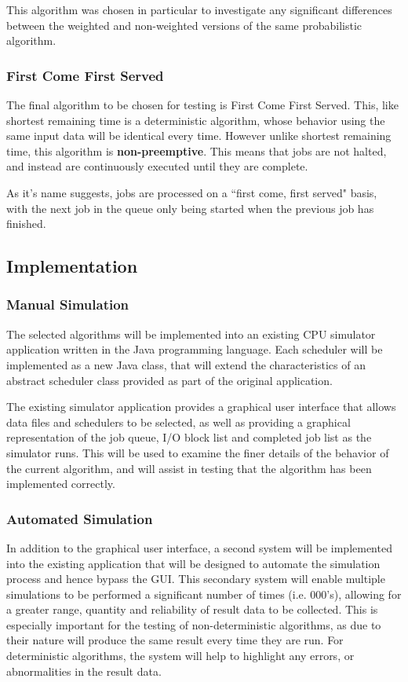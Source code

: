\documentclass{acm_proc_article-sp}
\begin{document}
This algorithm was chosen in particular to investigate any significant differences between the weighted and non-weighted versions of the same probabilistic algorithm. 

\subsubsection{First Come First Served}
The final algorithm to be chosen for testing is First Come First Served. This, like shortest remaining time is a deterministic algorithm,  whose behavior using the same input data will be identical every time. However unlike shortest remaining time, this algorithm is \textbf{non-preemptive}. This means that jobs are not halted, and instead are continuously executed until they are complete. 

As it's name suggests, jobs are processed on a ``first come, first served" basis, with the next job in the queue only being started when the previous job has finished. 

\subsection{Implementation}
\subsubsection{Manual Simulation}
The selected algorithms will be implemented into an existing CPU simulator application written in the Java programming language. Each scheduler will be implemented as a new Java class, that will extend the characteristics of an abstract scheduler class provided as part of the original application. 

The existing simulator application provides a graphical user interface that allows data files and schedulers to be selected, as well as providing a graphical representation of the job queue, I/O block list and completed job list as the simulator runs. This will be used to examine the finer details of the behavior of the current algorithm, and will assist in testing that the algorithm has been implemented correctly.

\subsubsection{Automated Simulation}
In addition to the graphical user interface, a second system will be implemented into the existing application that will be designed to automate the simulation process and hence bypass the GUI. This secondary system will enable multiple simulations to be performed a significant number of times (i.e. 000's), allowing for a greater range, quantity and reliability of result data to be collected. This is especially important for the testing of non-deterministic algorithms, as due to their nature will produce the same result every time they are run. For deterministic algorithms, the system will help to highlight any errors, or abnormalities in the result data. 
\end{document}
